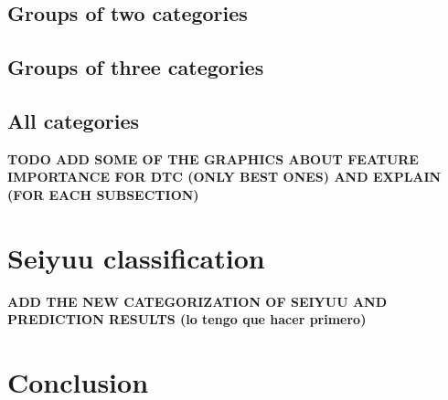 \subsection{Groups of two categories}
\subsection{Groups of three categories}
\subsection{All categories}

\textbf{TODO ADD SOME OF THE GRAPHICS ABOUT FEATURE IMPORTANCE FOR DTC (ONLY BEST ONES) AND EXPLAIN (FOR EACH SUBSECTION)}

\section{Seiyuu classification}
\textbf{ADD THE NEW CATEGORIZATION OF SEIYUU AND PREDICTION RESULTS (lo tengo que hacer primero)}

\section{Conclusion}
